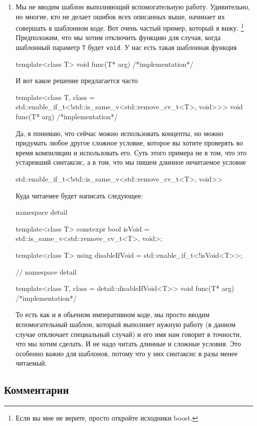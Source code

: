 \begin{enumerate}
\item Мы не вводим шаблон выполняющий вспомогательную работу.
Удивительно, но многие, кто не делает ошибок всех описанных выше, начинает их совершать в шаблонном коде.
Вот очень частый пример, который я вижу.%
\footnote{Если вы мне не верите, просто откройте исходники boost.}
Предположим, что мы хотим отключить функцию для случая, когда шаблонный параметр \verb"T" будет \verb"void".
У нас есть такая шаблонная функция
\begin{cppcode}
template<class T>
void func(T* arg) { /*implementation*/ }
\end{cppcode}
И вот какое решение предлагается часто
\begin{cppcode}
template<class T,
         class = std::enable_if_t<!std::is_same_v<std::remove_cv_t<T>, void>>>
void func(T* arg) { /*implementation*/ }
\end{cppcode}
Да, я понимаю, что сейчас можно использовать концепты, но можно придумать любое другое сложное условие, которое вы хотите проверять во время компиляции и использовать его.
Суть этого примера не в том, что это устаревший синтаксис, а в том, что мы пишем длинное нечитаемое условие
\begin{cppcode}[numbers = none]
std::enable_if_t<!std::is_same_v<std::remove_cv_t<T>, void>>
\end{cppcode}
Куда читаемее будет написать следующее:
\begin{cppcode}[numbers = none]
namespace detail {
template<class T>
constexpr bool isVoid = std::is_same_v<std::remove_cv_t<T>, void>;

template<class T>
using disableIfVoid = std::enable_if_t<!isVoid<T>>;
} // namespace detail

template<class T, class = detail::disableIfVoid<T>>
void func(T* arg) { /*implementation*/ }
\end{cppcode}
То есть как и в обычном императивном коде, мы просто вводим вспомогательный шаблон, который выполняет нужную работу (в данном случае отключает специальный случай) и его имя нам говорит в точности, что мы хотим сделать.
И не надо читать длинные и сложные условия.
Это особенно важно для шаблонов, потому что у них синтаксис в разы менее читаемый.
\end{enumerate}

\subsection{Комментарии}
\label{section::Comments}

